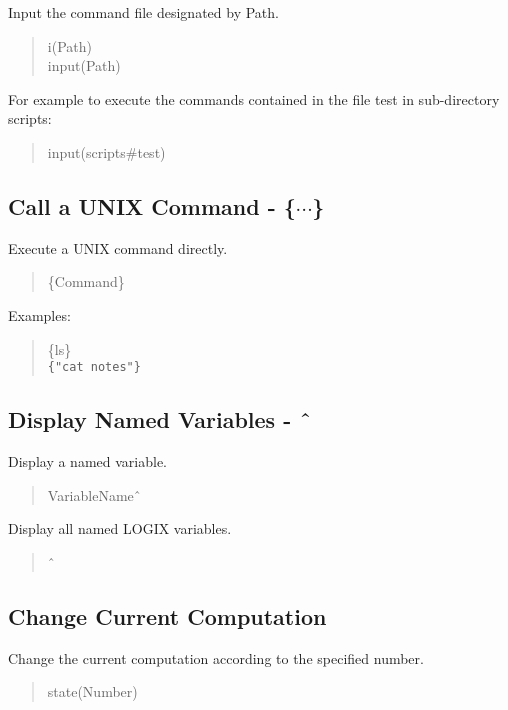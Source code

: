 Input the command file designated by Path.  

\begin{verse}
    i(Path) \\
    input(Path)
\end{verse}

\noindent
For example to execute
the commands contained in the file test in sub-directory scripts:

\begin{verse}
    input(scripts\#test)
\end{verse}

\subsection{Call a UNIX Command - \{$\cdots$\}}

Execute a UNIX command directly.

\begin{verse}
    \{Command\}
\end{verse}

\noindent
Examples:

\begin{verse}
    \{ls\} \\
    \verb+{"cat notes"}+
\end{verse}

\subsection{Display Named Variables - \^\ }

Display a named variable.

\begin{verse}
    VariableName\^\ 
\end{verse}

\noindent
Display all named LOGIX variables.

\begin{verse}
    \^\ 
\end{verse}

\subsection{Change Current Computation  }

Change the current computation according to the specified number.

\begin{verse}
    state(Number) 
\end{verse}

